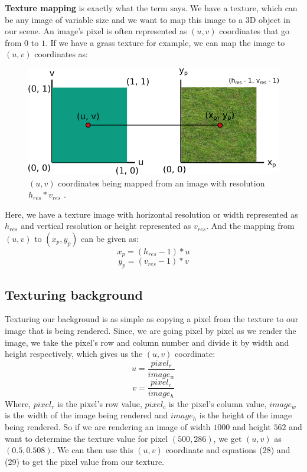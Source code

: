 \documentclass[11pt,a4paper]{article}
\begin{document}
	\textbf{Texture mapping} is exactly what the term says. We have a texture, which can be any image of variable size and we want to map this image to a 3D object in our scene. An image's pixel is often represented as $(u, v)$ coordinates that go from $0$ to $1$. If we have a grass texture for example, we can map the image to $(u, v)$ coordinates as:
	\begin{figure}[H]
		\centering
		\captionsetup{justification=centering}
		\includegraphics[width=.7\textwidth]{texture_mapping.png}\quad
		\caption{$(u, v)$ coordinates being mapped from an image with resolution $h_{res}*v_{res}$ \protect\cite{suffern2016ray}.}
	\end{figure}
	\noindent
	Here, we have a texture image with horizontal resolution or width represented as $h_{res}$ and vertical resolution or height represented as $v_{res}$. And the mapping from $(u, v)$ to $(x_{p}, y_{p})$ can be given as:
	\begin{equation}
		x_{p} = (h_{res} - 1)*u
	\end{equation}
	\begin{equation}
		y_{p} = (v_{res} - 1)*v
	\end{equation}
	
	\subsection{Texturing background}
	Texturing our background is as simple as copying a pixel from the texture to our image that is being rendered. Since, we are going pixel by pixel as we render the image, we take the pixel's row and column number and divide it by width and height respectively, which gives us the $(u, v)$ coordinate:
	\begin{equation}
		u = \frac{pixel_{r}}{image_{w}}
	\end{equation}
	\begin{equation}
		v = \frac{pixel_{c}}{image_{h}}
	\end{equation}
	\noindent
	Where, $pixel_{r}$ is the pixel's row value, $pixel_{c}$ is the pixel's column value, $image_{w}$ is the width of the image being rendered and $image_{h}$ is the height of the image being rendered. So if we are rendering an image of width $1000$ and height $562$ and want to determine the texture value for pixel $(500, 286)$, we get $(u, v)$ as $(0.5, 0.508)$. We can then use this $(u, v)$ coordinate and equations (28) and (29) to get the pixel value from our texture.
	
\end{document}

